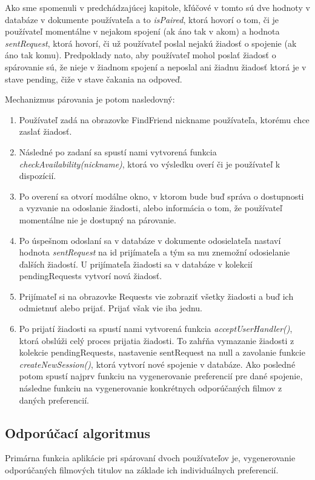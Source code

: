 Ako sme spomenuli v predchádzajúcej kapitole, kľúčové v tomto sú dve hodnoty v databáze v dokumente používateľa a to \textit{isPaired}, ktorá hovorí o tom, či je používateľ momentálne v nejakom spojení (ak áno tak v akom) a hodnota \textit{sentRequest}, ktorá hovorí, či už používateľ poslal nejakú žiadosť o spojenie (ak áno tak komu). Predpoklady nato, aby používateľ mohol poslať žiadosť o spárovanie sú, že nieje v žiadnom spojení a neposlal ani žiadnu žiadosť ktorá je v stave pending, čiže v stave čakania na odpoveď. 

Mechanizmus párovania je potom nasledovný:
\begin{enumerate}
    \item {Používateľ zadá na obrazovke FindFriend nickname používateľa, ktorému chce zaslať žiadosť.}
    \item {Následné po zadaní sa spustí nami vytvorená funkcia \textit{checkAvailability(nickname)}, ktorá vo výsledku overí či je používateľ k dispozícií.}
    \item {Po overení sa otvorí modálne okno, v ktorom bude buď správa o dostupnosti a vyzvanie na odoslanie žiadosti, alebo informácia o tom, že používateľ momentálne nie je dostupný na párovanie.}
    \item {Po úspešnom odoslaní sa v databáze v dokumente odosielateľa nastaví hodnota \textit{sentRequest} na id prijímateľa a tým sa mu znemožní odosielanie ďalších žiadostí. U prijímateľa žiadosti sa v databáze v kolekcií pendingRequests vytvorí nová žiadosť.}
    \item {Prijímateľ si na obrazovke Requests vie zobraziť všetky žiadosti a buď ich odmietnuť alebo prijať. Prijať však vie iba jednu.}
    \item {Po prijatí žiadosti sa spustí nami vytvorená funkcia \textit{acceptUserHandler()}, ktorá obslúži celý proces prijatia žiadosti. To zahŕňa vymazanie žiadosti z kolekcie pendingRequests, nastavenie sentRequest na null a zavolanie funkcie \textit{createNewSession()}, ktorá vytvorí nové spojenie v databáze. Ako posledné potom spustí najprv funkciu na vygenerovanie preferencií pre dané spojenie, následne funkciu na vygenerovanie konkrétnych odporúčaných filmov z daných preferencií.}
\end{enumerate}

\subsection{Odporúčací algoritmus}
Primárna funkcia aplikácie pri spárovaní dvoch používateľov je, vygenerovanie odporúčaných filmových titulov na základe ich individuálnych preferencií.  
